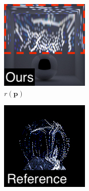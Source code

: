 \begin{figure}[]
\begin{subfigure}{\textwidth}
\begin{subfigure}{0.19\textwidth}
        \end{subfigure}
        \hfill
        \begin{subfigure}{0.19\textwidth}
            \centering
            \includegraphics[width=\textwidth]{images/04-experiment03/ball_dof/marble/stats_proj_highlighted2.jpg}
            \caption*{\(r(\bm{p})\)}
        \end{subfigure}
        \hfill
        \begin{subfigure}{0.19\textwidth}
            \centering
            \includegraphics[width=\textwidth]{images/04-experiment03/ball_dof/marble/pixel_im_label.jpg}

\end{subfigure}
\end{subfigure}
\end{figure}
